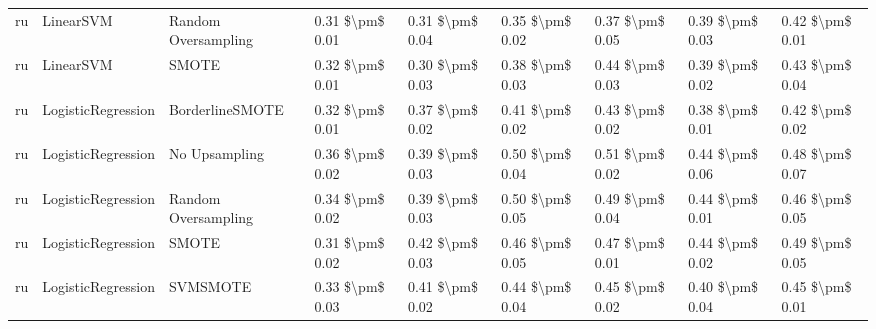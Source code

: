 \begin{tabular}{lllllllll}
      ru &                       LinearSVM &           Random Oversampling & 0.31 \$\textbackslash pm\$ 0.01 &           0.31 \$\textbackslash pm\$ 0.04 &       0.35 \$\textbackslash pm\$ 0.02 &        0.37 \$\textbackslash pm\$ 0.05 &                         0.39 \$\textbackslash pm\$ 0.03 &     0.42 \$\textbackslash pm\$ 0.01 \\
      ru &                       LinearSVM &                         SMOTE & 0.32 \$\textbackslash pm\$ 0.01 &           0.30 \$\textbackslash pm\$ 0.03 &       0.38 \$\textbackslash pm\$ 0.03 &        0.44 \$\textbackslash pm\$ 0.03 &                         0.39 \$\textbackslash pm\$ 0.02 &     0.43 \$\textbackslash pm\$ 0.04 \\
      ru &              LogisticRegression &               BorderlineSMOTE & 0.32 \$\textbackslash pm\$ 0.01 &           0.37 \$\textbackslash pm\$ 0.02 &       0.41 \$\textbackslash pm\$ 0.02 &        0.43 \$\textbackslash pm\$ 0.02 &                         0.38 \$\textbackslash pm\$ 0.01 &     0.42 \$\textbackslash pm\$ 0.02 \\
      ru &              LogisticRegression &                 No Upsampling & 0.36 \$\textbackslash pm\$ 0.02 &           0.39 \$\textbackslash pm\$ 0.03 &       0.50 \$\textbackslash pm\$ 0.04 &        0.51 \$\textbackslash pm\$ 0.02 &                         0.44 \$\textbackslash pm\$ 0.06 &     0.48 \$\textbackslash pm\$ 0.07 \\
      ru &              LogisticRegression &           Random Oversampling & 0.34 \$\textbackslash pm\$ 0.02 &           0.39 \$\textbackslash pm\$ 0.03 &       0.50 \$\textbackslash pm\$ 0.05 &        0.49 \$\textbackslash pm\$ 0.04 &                         0.44 \$\textbackslash pm\$ 0.01 &     0.46 \$\textbackslash pm\$ 0.05 \\
      ru &              LogisticRegression &                         SMOTE & 0.31 \$\textbackslash pm\$ 0.02 &           0.42 \$\textbackslash pm\$ 0.03 &       0.46 \$\textbackslash pm\$ 0.05 &        0.47 \$\textbackslash pm\$ 0.01 &                         0.44 \$\textbackslash pm\$ 0.02 &     0.49 \$\textbackslash pm\$ 0.05 \\
      ru &              LogisticRegression &                      SVMSMOTE & 0.33 \$\textbackslash pm\$ 0.03 &           0.41 \$\textbackslash pm\$ 0.02 &       0.44 \$\textbackslash pm\$ 0.04 &        0.45 \$\textbackslash pm\$ 0.02 &                         0.40 \$\textbackslash pm\$ 0.04 &     0.45 \$\textbackslash pm\$ 0.01 \\

\end{tabular}
